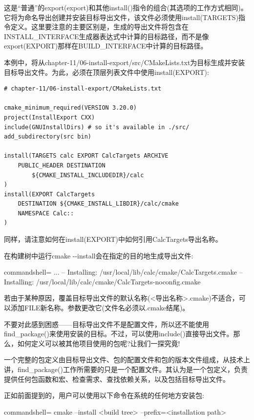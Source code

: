 这是“普通”的export(export)和其他install()指令的组合(其选项的工作方式相同)。它将为命名导出创建并安装目标导出文件，该文件必须使用install(TARGETS)指令定义。这里要注意的主要区别是，生成的导出文件将包含在INSTALL\_INTERFACE生成器表达式中计算的目标路径，而不是像export(EXPORT)那样在BUILD\_INTERFACE中计算的目标路径。

本例中，将从chapter-11/06-install-export/src/CMakeLists.txt为目标生成并安装目标导出文件。为此，必须在顶层列表文件中使用install(EXPORT):

\begin{lstlisting}[style=styleCMake]
# chapter-11/06-install-export/CMakeLists.txt

cmake_minimum_required(VERSION 3.20.0)
project(InstallExport CXX)
include(GNUInstallDirs) # so it's available in ./src/
add_subdirectory(src bin)

install(TARGETS calc EXPORT CalcTargets ARCHIVE
	PUBLIC_HEADER DESTINATION
		${CMAKE_INSTALL_INCLUDEDIR}/calc
)
install(EXPORT CalcTargets
	DESTINATION ${CMAKE_INSTALL_LIBDIR}/calc/cmake
	NAMESPACE Calc::
)
\end{lstlisting}

同样，请注意如何在install(EXPORT)中如何引用CalcTargets导出名称。

在构建树中运行cmake -{}-install会在指定的目的地生成导出文件:

\begin{tcblisting}{commandshell={}}
...
-- Installing: /usr/local/lib/calc/cmake/CalcTargets.cmake
-- Installing: /usr/local/lib/calc/cmake/CalcTargets-noconfig.cmake
\end{tcblisting}

若由于某种原因，覆盖目标导出文件的默认名称(<导出名称>.cmake)不适合，可以添加FILE新名称。参数更改它(文件名必须以.cmake结尾)。

不要对此感到困惑——目标导出文件不是配置文件，所以还不能使用find\_package()来使用安装的目标。不过，可以使用include()直接导出文件。那么，如何定义可以被其他项目使用的包呢?让我们一探究竟!


一个完整的包定义由目标导出文件、包的配置文件和包的版本文件组成，从技术上讲，find\_package()工作所需要的只是一个配置文件。其认为是一个包定义，负责提供任何包函数和宏、检查需求、查找依赖关系，以及包括目标导出文件。

正如前面提到的，用户可以使用以下命令在系统的任何地方安装包:

\begin{tcblisting}{commandshell={}}
cmake --install <build tree> --prefix=<installation path>
\end{tcblisting}

